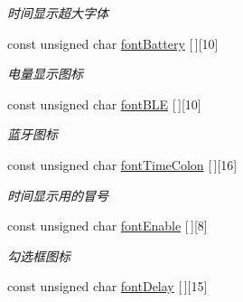 \begin{DoxyCompactItemize}
\begin{DoxyCompactList}\small\item\em 时间显示超大字体 \end{DoxyCompactList}\item 
\hypertarget{group___w_i_d_g_e_t_ga9cac21b10aac988fd92e2cd2c78a4319}{const unsigned char \hyperlink{group___w_i_d_g_e_t_ga9cac21b10aac988fd92e2cd2c78a4319}{font\-Battery} \mbox{[}$\,$\mbox{]}\mbox{[}10\mbox{]}}\label{group___w_i_d_g_e_t_ga9cac21b10aac988fd92e2cd2c78a4319}

\begin{DoxyCompactList}\small\item\em 电量显示图标 \end{DoxyCompactList}\item 
\hypertarget{group___w_i_d_g_e_t_gae789ac73b9f8bf563ff477571af3e532}{const unsigned char \hyperlink{group___w_i_d_g_e_t_gae789ac73b9f8bf563ff477571af3e532}{font\-B\-L\-E} \mbox{[}$\,$\mbox{]}\mbox{[}10\mbox{]}}\label{group___w_i_d_g_e_t_gae789ac73b9f8bf563ff477571af3e532}

\begin{DoxyCompactList}\small\item\em 蓝牙图标 \end{DoxyCompactList}\item 
\hypertarget{group___w_i_d_g_e_t_ga934cfdf8aedca0ff9a8794005da8d5e0}{const unsigned char \hyperlink{group___w_i_d_g_e_t_ga934cfdf8aedca0ff9a8794005da8d5e0}{font\-Time\-Colon} \mbox{[}$\,$\mbox{]}\mbox{[}16\mbox{]}}\label{group___w_i_d_g_e_t_ga934cfdf8aedca0ff9a8794005da8d5e0}

\begin{DoxyCompactList}\small\item\em 时间显示用的冒号 \end{DoxyCompactList}\item 
\hypertarget{group___w_i_d_g_e_t_ga7ef23e7312ba1eef34a75bae365cf3e3}{const unsigned char \hyperlink{group___w_i_d_g_e_t_ga7ef23e7312ba1eef34a75bae365cf3e3}{font\-Enable} \mbox{[}$\,$\mbox{]}\mbox{[}8\mbox{]}}\label{group___w_i_d_g_e_t_ga7ef23e7312ba1eef34a75bae365cf3e3}

\begin{DoxyCompactList}\small\item\em 勾选框图标 \end{DoxyCompactList}\item 
\hypertarget{group___w_i_d_g_e_t_ga4281d2c990312a449f8115a73da5d4b6}{const unsigned char \hyperlink{group___w_i_d_g_e_t_ga4281d2c990312a449f8115a73da5d4b6}{font\-Delay} \mbox{[}$\,$\mbox{]}\mbox{[}15\mbox{]}}\label{group___w_i_d_g_e_t_ga4281d2c990312a449f8115a73da5d4b6}


\end{DoxyCompactItemize}
